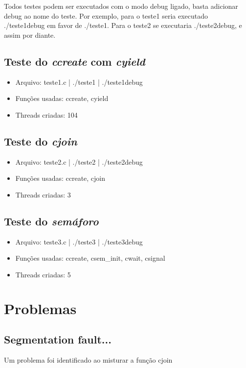 \documentclass{article}
\begin{document}
Todos testes podem ser executados com o modo debug ligado, basta adicionar debug ao nome do teste. Por exemplo, para o teste1 seria executado ./teste1debug em favor de ./teste1. Para o teste2 se executaria ./teste2debug, e assim por diante.

\subsection{Teste do \textit{ccreate} com \textit{cyield}}
\begin{itemize}
\item Arquivo: teste1.c | ./teste1 | ./teste1debug
\item Funções usadas: ccreate, cyield
\item Threads criadas: 104
\end{itemize}

\subsection{Teste do \textit{cjoin}}
\begin{itemize}
\item Arquivo: teste2.c | ./teste2 | ./teste2debug
\item Funções usadas: ccreate, cjoin
\item Threads criadas: 3
\end{itemize}

\subsection{Teste do \textit{semáforo}}
\begin{itemize}
\item Arquivo: teste3.c | ./teste3 | ./teste3debug
\item Funções usadas: ccreate, csem\_init, cwait, csignal
\item Threads criadas: 5
\end{itemize}

\section{Problemas}
\subsection{Segmentation fault...}
Um problema foi identificado ao misturar a função cjoin
\end{document}
